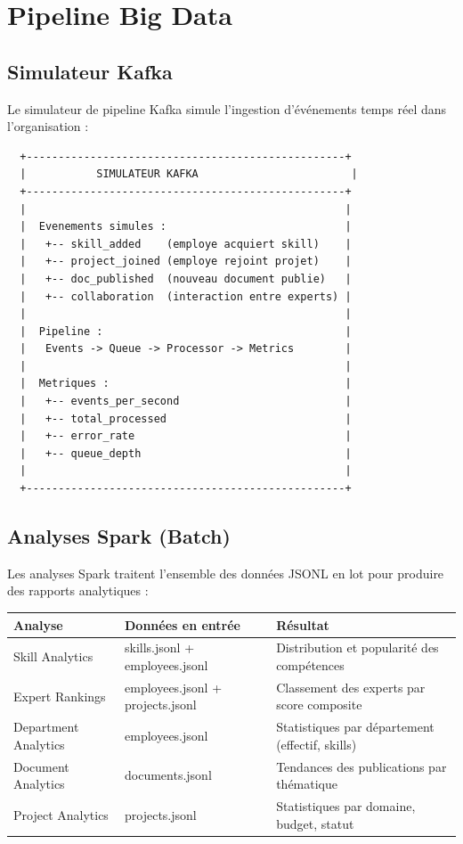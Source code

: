 \documentclass[12pt,a4paper]{article}
\begin{document}
\section{Pipeline Big Data}

\subsection{Simulateur Kafka}

Le simulateur de pipeline Kafka simule l'ingestion d'événements temps réel dans l'organisation :

\begin{verbatim}
  +--------------------------------------------------+
  |           SIMULATEUR KAFKA                        |
  +--------------------------------------------------+
  |                                                  |
  |  Evenements simules :                            |
  |   +-- skill_added    (employe acquiert skill)    |
  |   +-- project_joined (employe rejoint projet)    |
  |   +-- doc_published  (nouveau document publie)   |
  |   +-- collaboration  (interaction entre experts) |
  |                                                  |
  |  Pipeline :                                      |
  |   Events -> Queue -> Processor -> Metrics        |
  |                                                  |
  |  Metriques :                                     |
  |   +-- events_per_second                          |
  |   +-- total_processed                            |
  |   +-- error_rate                                 |
  |   +-- queue_depth                                |
  |                                                  |
  +--------------------------------------------------+
\end{verbatim}

\subsection{Analyses Spark (Batch)}

Les analyses Spark traitent l'ensemble des données JSONL en lot pour produire des rapports analytiques :

\begin{longtable}{|p{4cm}|p{4.5cm}|p{5cm}|}
\hline
\rowcolor{bleu!15}
\textbf{Analyse} & \textbf{Données en entrée} & \textbf{Résultat} \\
\hline
Skill Analytics & skills.jsonl + employees.jsonl & Distribution et popularité des compétences \\
\hline
Expert Rankings & employees.jsonl + projects.jsonl & Classement des experts par score composite \\
\hline
Department Analytics & employees.jsonl & Statistiques par département (effectif, skills) \\
\hline
Document Analytics & documents.jsonl & Tendances des publications par thématique \\
\hline
Project Analytics & projects.jsonl & Statistiques par domaine, budget, statut \\
\hline
\end{longtable}
\end{document}
